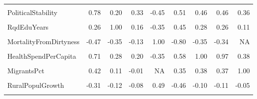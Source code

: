 \documentclass[
]{article}
\begin{document}
\begin{table}
{\begin{tabular}[t]{lrrrrrrrr}
\cellcolor{gray!10}{InternetUsersPct} & \cellcolor{gray!10}{0.57} & \cellcolor{gray!10}{0.38} & \cellcolor{gray!10}{0.17} & \cellcolor{gray!10}{-0.76} & \cellcolor{gray!10}{0.82} & \cellcolor{gray!10}{0.64} & \cellcolor{gray!10}{0.63} & \cellcolor{gray!10}{0.37}\\
\addlinespace
PoliticalStability & 0.78 & 0.20 & 0.33 & -0.45 & 0.51 & 0.46 & 0.46 & 0.36\\
\cellcolor{gray!10}{RuleOfLaw} & \cellcolor{gray!10}{1.00} & \cellcolor{gray!10}{0.26} & \cellcolor{gray!10}{0.29} & \cellcolor{gray!10}{-0.47} & \cellcolor{gray!10}{0.62} & \cellcolor{gray!10}{0.71} & \cellcolor{gray!10}{0.70} & \cellcolor{gray!10}{0.42}\\
RqdEduYears & 0.26 & 1.00 & 0.16 & -0.35 & 0.45 & 0.28 & 0.26 & 0.11\\
\cellcolor{gray!10}{GovtEduSpendPctGDP} & \cellcolor{gray!10}{0.29} & \cellcolor{gray!10}{0.16} & \cellcolor{gray!10}{1.00} & \cellcolor{gray!10}{-0.13} & \cellcolor{gray!10}{0.25} & \cellcolor{gray!10}{0.20} & \cellcolor{gray!10}{0.21} & \cellcolor{gray!10}{-0.01}\\
MortalityFromDirtyness & -0.47 & -0.35 & -0.13 & 1.00 & -0.80 & -0.35 & -0.34 & NA\\
\addlinespace
\cellcolor{gray!10}{UHCServiceCoverage} & \cellcolor{gray!10}{0.62} & \cellcolor{gray!10}{0.45} & \cellcolor{gray!10}{0.25} & \cellcolor{gray!10}{-0.80} & \cellcolor{gray!10}{1.00} & \cellcolor{gray!10}{0.58} & \cellcolor{gray!10}{0.56} & \cellcolor{gray!10}{0.35}\\
HealthSpendPerCapita & 0.71 & 0.28 & 0.20 & -0.35 & 0.58 & 1.00 & 0.97 & 0.38\\
\cellcolor{gray!10}{GovtHealthSpendPerCapita} & \cellcolor{gray!10}{0.70} & \cellcolor{gray!10}{0.26} & \cellcolor{gray!10}{0.21} & \cellcolor{gray!10}{-0.34} & \cellcolor{gray!10}{0.56} & \cellcolor{gray!10}{0.97} & \cellcolor{gray!10}{1.00} & \cellcolor{gray!10}{0.37}\\
MigrantsPct & 0.42 & 0.11 & -0.01 & NA & 0.35 & 0.38 & 0.37 & 1.00\\
\cellcolor{gray!10}{FoodInsecurityPct} & \cellcolor{gray!10}{-0.68} & \cellcolor{gray!10}{-0.30} & \cellcolor{gray!10}{-0.22} & \cellcolor{gray!10}{0.70} & \cellcolor{gray!10}{-0.79} & \cellcolor{gray!10}{-0.52} & \cellcolor{gray!10}{-0.53} & \cellcolor{gray!10}{-0.39}\\
\addlinespace
RuralPopulGrowth & -0.31 & -0.12 & -0.08 & 0.49 & -0.46 & -0.10 & -0.11 & -0.05\\
\cellcolor{gray!10}{VoiceAccountability} & \cellcolor{gray!10}{0.82} & \cellcolor{gray!10}{0.32} & \cellcolor{gray!10}{0.31} & \cellcolor{gray!10}{-0.34} & \cellcolor{gray!10}{0.50} & \cellcolor{gray!10}{0.57} & \cellcolor{gray!10}{0.56} & \cellcolor{gray!10}{0.17}\\

\end{tabular}}
\end{table}
\end{document}
